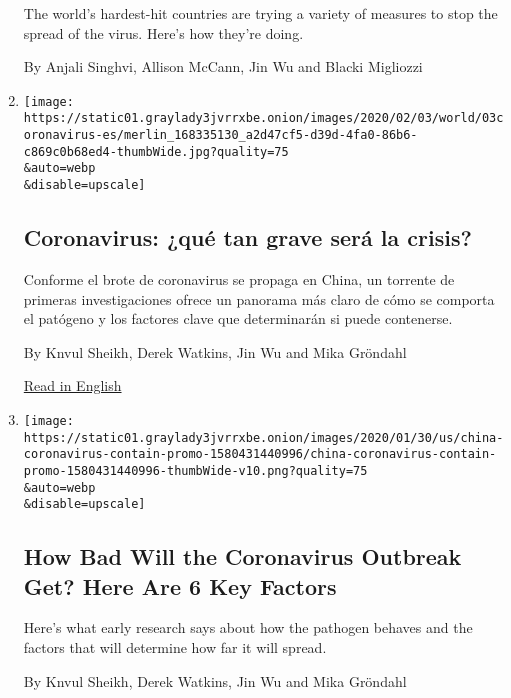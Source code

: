 \begin{enumerate}
  The world's hardest-hit countries are trying a variety of measures to
  stop the spread of the virus. Here's how they're doing.

  By Anjali Singhvi, Allison McCann, Jin Wu and Blacki Migliozzi
\item
  \href{/es/2020/02/04/espanol/mundo/coronavirus-vacuna-viaje.html}{}

  \texttt{[image: https://static01.graylady3jvrrxbe.onion/images/2020/02/03/world/03coronavirus-es/merlin\_168335130\_a2d47cf5-d39d-4fa0-86b6-c869c0b68ed4-thumbWide.jpg?quality=75\\\&auto=webp\\\&disable=upscale]}

  \hypertarget{coronavirus-quuxe9-tan-grave-seruxe1-la-crisis}{%
  \subsection{Coronavirus: ¿qué tan grave será la
  crisis?}\label{coronavirus-quuxe9-tan-grave-seruxe1-la-crisis}}

  Conforme el brote de coronavirus se propaga en China, un torrente de
  primeras investigaciones ofrece un panorama más claro de cómo se
  comporta el patógeno y los factores clave que determinarán si puede
  contenerse.

  By Knvul Sheikh, Derek Watkins, Jin Wu and Mika Gröndahl

  \href{https://www.nytimes3xbfgragh.onion/interactive/2020/world/asia/china-coronavirus-contain.html}{Read
  in English}
\item
  \href{/interactive/2020/world/asia/china-coronavirus-contain.html}{}

  \texttt{[image: https://static01.graylady3jvrrxbe.onion/images/2020/01/30/us/china-coronavirus-contain-promo-1580431440996/china-coronavirus-contain-promo-1580431440996-thumbWide-v10.png?quality=75\\\&auto=webp\\\&disable=upscale]}

  \hypertarget{how-bad-will-the-coronavirus-outbreak-get-here-are-6-key-factors}{%
  \subsection{How Bad Will the Coronavirus Outbreak Get? Here Are 6 Key
  Factors}\label{how-bad-will-the-coronavirus-outbreak-get-here-are-6-key-factors}}

  Here's what early research says about how the pathogen behaves and the
  factors that will determine how far it will spread.

  By Knvul Sheikh, Derek Watkins, Jin Wu and Mika Gröndahl
\end{enumerate}

